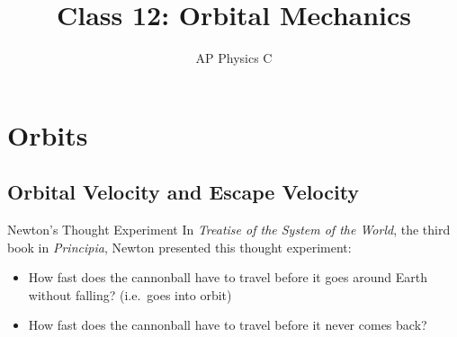 \documentclass[12pt,compress,aspectratio=169]{beamer}
\title{Class 12: Orbital Mechanics}
\subtitle{AP Physics C}
\begin{document}
\begin{frame}
  \maketitle
\end{frame}


\section{Orbits}

\subsection{Orbital Velocity and Escape Velocity}

\begin{frame}{Newton's Thought Experiment}
  In \emph{Treatise of the System of the World}, the third book in
  \emph{Principia}, Newton presented this thought experiment:
  \begin{center}
  \end{center}
  \begin{itemize}
  \item How fast does the cannonball have to travel before it goes around Earth
    without falling? (i.e.\ goes into orbit)
  \item How fast does the cannonball have to travel before it never comes back?
  \end{itemize}
\end{frame}
\end{document}

